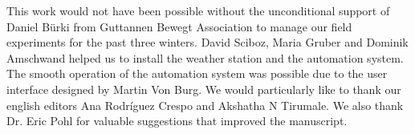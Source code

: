 \documentclass[tc, manuscript]{copernicus}
\begin{document}


\begin{acknowledgements}
This work would not have been possible without the unconditional support of Daniel Bürki from Guttannen Bewegt
Association to manage our field experiments for the past three winters. David Sciboz, Maria Gruber and Dominik
Amschwand helped us to install the weather station and the automation system. The smooth operation of the
automation system was possible due to the user interface designed by Martin Von Burg. We would particularly like
to thank our english editors Ana Rodríguez Crespo and Akshatha N Tirumale. We also thank Dr. Eric Pohl for
valuable suggestions that improved the manuscript. 

\end{acknowledgements}



\end{document}
